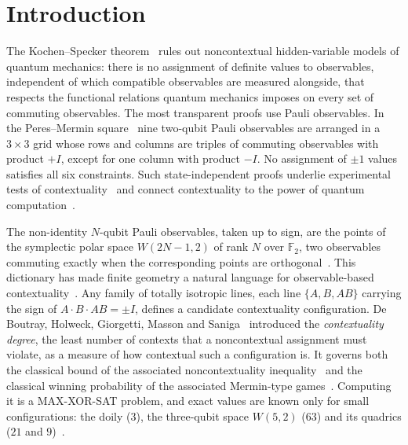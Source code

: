 \documentclass[11pt]{article}
\theoremstyle{definition}
\theoremstyle{remark}
\newcommand{\F}{\mathbb{F}}
\begin{document}
\section{Introduction}
The Kochen--Specker theorem~\cite{KS67,Bell66} rules out noncontextual hidden-variable models of quantum mechanics: there is no assignment of definite values to observables, independent of which compatible observables are measured alongside, that respects the functional relations quantum mechanics imposes on every set of commuting observables.
The most transparent proofs use Pauli observables.
In the Peres--Mermin square~\cite{Peres90,Mermin90,Mermin93} nine two-qubit Pauli observables are arranged in a $3\times3$ grid whose rows and columns are triples of commuting observables with product $+I$, except for one column with product $-I$. No assignment of $\pm1$ values satisfies all six constraints.
Such state-independent proofs underlie experimental tests of contextuality~\cite{Cabello08,Kirchmair09,Amselem09} and connect contextuality to the power of quantum computation~\cite{Raussendorf13,Howard14}.

The non-identity $N$-qubit Pauli observables, taken up to sign, are the points of the symplectic polar space $W(2N-1,2)$ of rank $N$ over $\F_2$, two observables commuting exactly when the corresponding points are orthogonal~\cite{SanigaPlanat07,Havlicek09,Thas09}.
This dictionary has made finite geometry a natural language for observable-based contextuality~\cite{Holweck17,Trandafir22,Levay13,SanigaLevayPracna12}.
Any family of totally isotropic lines, each line $\{A,B,AB\}$ carrying the sign of $A\cdot B\cdot AB=\pm I$, defines a candidate contextuality configuration.
De Boutray, Holweck, Giorgetti, Masson and Saniga~\cite{deBoutray22} introduced the \emph{contextuality degree}, the least number of contexts that a noncontextual assignment must violate, as a measure of how contextual such a configuration is.
It governs both the classical bound of the associated noncontextuality inequality~\cite{Cabello10,Kelleher24} and the classical winning probability of the associated Mermin-type games~\cite{Arkhipov12,Kelleher24}.
Computing it is a MAX-XOR-SAT problem, and exact values are known only for small configurations: the doily ($3$), the three-qubit space $W(5,2)$ ($63$) and its quadrics ($21$ and $9$)~\cite{deBoutray22,Muller22doilies,Saniga24hex}.
\end{document}

